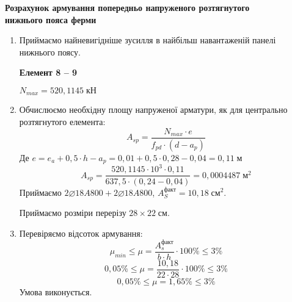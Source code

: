 \documentclass[a4paper,14pt]{article}
\begin{document}
\textbf{Розрахунок армування попередньо напруженого розтягнутого\\нижнього пояса ферми}
\begin{enumerate}
    \item Приймаємо найневигідніше зусилля в найбільш навантаженій панелі нижнього поясу.
    
        \textbf{Елемент 8 -- 9}

        $N_{max} = 520,1145\;\textit{кН}$
    \item Обчислюємо необхідну площу напруженої арматури, як для центрально розтягнутого елемента:
        \begin{equation}
            A_{sp} = \dfrac{N_{max} \cdot e}{f_{pd} \cdot (d - a_p)}
        \end{equation}
        Де $e = e_a + 0,5 \cdot h - a_p = 0,01 + 0,5 \cdot 0,28 - 0,04 = 0,11\;\textit{м}$
        $$A_{sp} = \dfrac{520,1145 \cdot 10^3 \cdot 0,11}{637,5 \cdot (0,24 - 0,04)} = 0,0004487\;\textit{м}^2$$
        Приймаємо $2\varnothing18A800 + 2\varnothing18A800$, $A_S^{\textit{факт}} = 10,18\;\textit{см}^2$.

        Приймаємо розміри перерізу $28 \times 22\;\textit{см}$.
    \item Перевіряємо відсоток армування:
        \begin{equation}
            \mu_{min} \leq \mu = \dfrac{A_{s}^{\textit{факт}}}{b \cdot h} \cdot 100\% \leq 3\% 
        \end{equation}
        $$0,05\% \leq \mu = \dfrac{10,18}{22 \cdot 28} \cdot 100\% \leq 3\% $$
        $$0,05\% \leq \mu = 1,65\% \leq 3\%$$
        Умова виконується.
\end{enumerate}
\end{document}
